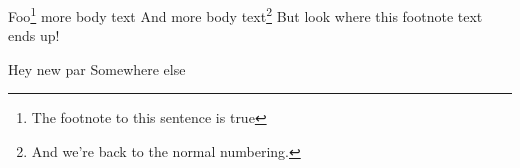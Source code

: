 \documentclass[a5paper,12pt]{article}
\begin{document}
Foo\footnote{The footnote to this sentence is true\footnotemark}
more body text
And more body text\footnote{And we're back to the normal numbering.}
But look where this footnote text ends up!\footnotemark

Hey new par\footnotemark[17]
\newpage%
Somewhere else
\end{document}
